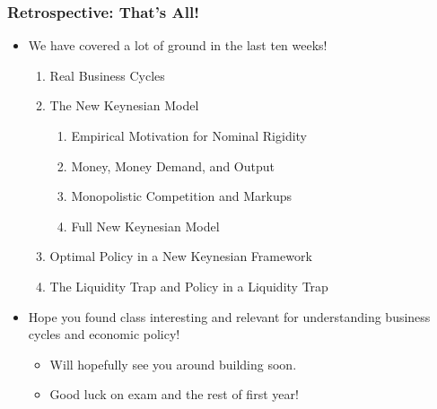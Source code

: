 \documentclass[english,xcolor=svgnames]{beamer}
\begin{document}
\begin{frame}
\frametitle{Retrospective: That's All!}
\begin{itemize}
	\item We have covered a lot of ground in the last ten weeks!
	\begin{enumerate}
		\item Real Business Cycles
		\item The New Keynesian Model
		\begin{enumerate}
			\item Empirical Motivation for Nominal Rigidity
			\item Money, Money Demand, and Output
			\item Monopolistic Competition and Markups
			\item Full New Keynesian Model
		\end{enumerate}
		\item Optimal Policy in a New Keynesian Framework
		\item The Liquidity Trap and Policy in a Liquidity Trap
	\end{enumerate}	
	\item Hope you found class interesting and relevant for understanding business cycles and economic policy!
	\begin{itemize}
		\item Will hopefully see you around building soon.
		\item Good luck on exam and the rest of first year!
	\end{itemize}
\end{itemize}
\end{frame}
\end{document}
